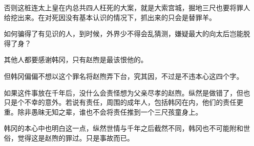 否则这桩连太上皇在内总共四人枉死的大案，就是大索宫城，掘地三尺也要将罪人给挖出来。在对死因没有基本认识的情况下，抓出来的只会是替罪羊。

如何骗得了有见识的人，到时候，外界少不得会乱猜测，嫌疑最大的向太后岂能脱得了身？

其他人都要感谢韩冈，只有赵煦是最该恨他的。

但韩冈偏偏不想以这个罪名将赵煦弄下台，究其因，不过是不违本心这四个字。

如果这件事放在千年后，没什么会责怪想为父亲尽孝的赵煦。纵然是做错了，但也只是个不幸的意外。若说有责任，周围的成年人，包括韩冈在内，他们的责任更重。除非愚昧无知之辈，谁也不会将责任推到一个三尺孩童身上。

韩冈的本心中也明白这一点，纵然世情与千年之后截然不同，韩冈也不可能附和世俗，觉得这是赵煦的罪过。只是事故而已。
